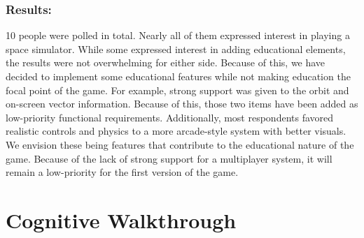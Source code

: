 \subsubsection{Results:}

  \parbox[t]{6.5in}{10 people were polled in total. Nearly all of them expressed interest in playing a space simulator. While some expressed interest in adding educational elements, the results were not overwhelming for either side. Because of this, we have decided to implement some educational features while not making education the focal point of the game. For example, strong support was given to the orbit and on-screen vector information. Because of this, those two items have been added as low-priority functional requirements. Additionally, most respondents favored realistic controls and physics to a more arcade-style system with better visuals. We envision these being features that contribute to the educational nature of the game. Because of the lack of strong support for a multiplayer system, it will remain a low-priority for the first version of the game.}

\section{Cognitive Walkthrough}


